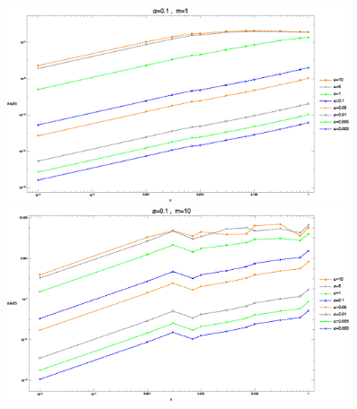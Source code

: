 \documentclass[hyperref]{ctexart}
\begin{document}
\begin{figure}[!htbp]
\begin{minipage}[t]{0.5\linewidth}
  \centering
  \includegraphics[width=0.9\textwidth]{Test_Coulomb_5_Various_a.eps}
\end{minipage}
\begin{minipage}[t]{0.5\linewidth}
  \centering
  \includegraphics[width=0.9\textwidth]{Test_Coulomb_5_Various_a_1.eps}
\end{minipage}\\


\end{figure}
\end{document}
